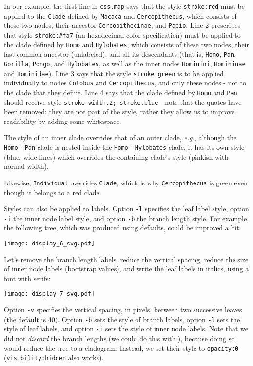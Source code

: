 In our example, the first line in \texttt{css.map} says that the style
\texttt{stroke:red} must be applied to the \texttt{Clade} defined by
\texttt{Macaca} and \texttt{Cercopithecus}, which consists of these two nodes,
their ancestor \texttt{Cercopithecinae}, and \texttt{Papio}. Line 2
prescribes that style \texttt{stroke:\#fa7} (an \svg{} hexadecimal color
specification) must be applied to the clade defined by \texttt{Homo} and
\texttt{Hylobates}, which consists of these two nodes, their last common
ancestor (unlabeled), and all its descendants (that is, \texttt{Homo},
\texttt{Pan}, \texttt{Gorilla}, \texttt{Pongo}, and \texttt{Hylobates}, as well
as the inner nodes \texttt{Hominini}, \texttt{Homininae} and
\texttt{Hominidae}). Line 3 says that the style \texttt{stroke:green} is to be
applied individually to nodes \texttt{Colobus} and \texttt{Cercopithecus}, and
only these nodes - not to the clade that they define.  Line 4 says that the
clade defined by \texttt{Homo} and \texttt{Pan} should receive style
\texttt{stroke-width:2;~stroke:blue} - note that the quotes have been removed:
they are not part of the style, rather they allow us to improve readability by
adding some whitespace.

The style of an inner clade overrides that of an outer clade, \textit{e.g.},
although the \texttt{Homo} - \texttt{Pan} clade is nested inside the
\texttt{Homo} - \texttt{Hylobates} clade, it has its own style (blue, wide
lines) which overrides the containing clade's style (pinkish with normal
width).

Likewise, \texttt{Individual} overrides \texttt{Clade}, which is why
\texttt{Cercopithecus} is green even though it belongs to a red clade.

Styles can also be applied to labels. Option \texttt{-l} specifies the leaf
label style, option \texttt{-i} the inner node label style, and option
\texttt{-b} the branch length style. For example, the following tree, which was
produced using defaults, could be improved a bit:


\begin{center}
  \texttt{[image: display\_6\_svg.pdf]}
\end{center}

\noindent{}Let's remove the branch length labels, reduce
the vertical spacing, reduce the size of inner node labels (bootstrap values),
and write the leaf labels in italics, using a font with serifs:

\begin{center}
  \texttt{[image: display\_7\_svg.pdf]}
\end{center}
Option \texttt{-v} specifies the vertical spacing, in pixels, between two
successive leaves (the default is 40). Option \texttt{-b} sets the style of
branch labels, option \texttt{-l} sets the style of leaf labels, and option
\texttt{-i} sets the style of inner node labels. Note that we did not
\emph{discard} the branch lengths (we could do this with \topology), because
doing so would reduce the tree to a cladogram. Instead, we set their \css{}
style to \texttt{opacity:0} (\texttt{visibility:hidden} also works).

